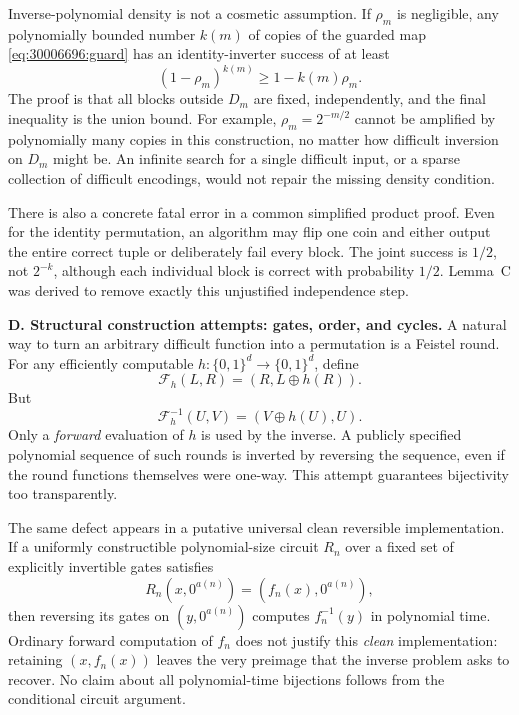 \documentclass[11pt,a4paper]{article}
\numberwithin{equation}{section}
\begin{document}
Inverse-polynomial density is not a cosmetic assumption. If $\rho_m$
is negligible, any polynomially bounded number $k(m)$ of copies of the
guarded map \eqref{eq:30006696:guard} has an identity-inverter success of at
least
\begin{equation}\label{eq:30006696:sparse}
 (1-\rho_m)^{k(m)}\ge1-k(m)\rho_m.
\end{equation}
The proof is that all blocks outside $D_m$ are fixed, independently,
and the final inequality is the union bound. For example,
$\rho_m=2^{-m/2}$ cannot be amplified by polynomially many copies in
this construction, no matter how difficult inversion on $D_m$ might be.
An infinite search for a single difficult input, or a sparse collection
of difficult encodings, would not repair the missing density condition.

There is also a concrete fatal error in a common simplified product
proof. Even for the identity permutation, an algorithm may flip one
coin and either output the entire correct tuple or deliberately fail
every block. The joint success is $1/2$, not $2^{-k}$, although each
individual block is correct with probability $1/2$. Lemma~C was derived
to remove exactly this unjustified independence step.

\medskip{}
\textbf{D. Structural construction attempts: gates, order, and cycles.}
A natural way to turn an arbitrary difficult function into a permutation
is a Feistel round. For any efficiently computable
$h:\{0,1\}^d\to\{0,1\}^d$, define
\[
 \mathcal F_h(L,R)=(R,L\mathbin\oplus h(R)).
\]
But
\begin{equation}\label{eq:30006696:feistel}
 \mathcal F_h^{-1}(U,V)=(V\mathbin\oplus h(U),U).
\end{equation}
Only a \emph{forward} evaluation of $h$ is used by the inverse. A
publicly specified polynomial sequence of such rounds is inverted by
reversing the sequence, even if the round functions themselves were
one-way. This attempt guarantees bijectivity too transparently.

The same defect appears in a putative universal clean reversible
implementation. If a uniformly constructible polynomial-size circuit
$R_n$ over a fixed set of explicitly invertible gates satisfies
\[
 R_n(x,0^{a(n)})=(f_n(x),0^{a(n)}),
\]
then reversing its gates on $(y,0^{a(n)})$ computes $f_n^{-1}(y)$ in
polynomial time. Ordinary forward computation of $f_n$ does not justify
this \emph{clean} implementation: retaining $(x,f_n(x))$ leaves the very
preimage that the inverse problem asks to recover. No claim about all
polynomial-time bijections follows from the conditional circuit argument.
\end{document}
